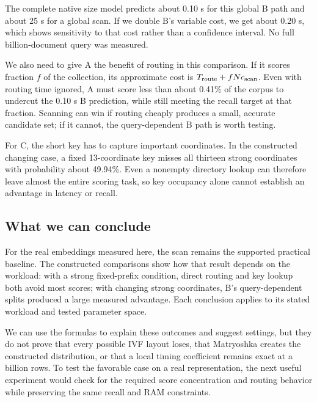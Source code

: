 The complete native size model predicts about 0.10 s for this global B path and about 25 s
for a global scan. If we double B's variable cost, we get about 0.20 s, which shows sensitivity
to that cost rather than a confidence interval. No full billion-document query was measured.

We also need to give A the benefit of routing in this comparison. If it scores fraction $f$
of the collection, its approximate cost is $T_{\rm route}+fNc_{\rm scan}$. Even with routing
time ignored, A must score less than about 0.41\% of the corpus to undercut the 0.10 s B
prediction, while still meeting the recall target at that fraction. Scanning can win if
routing cheaply produces a small, accurate candidate set; if it cannot, the query-dependent
B path is worth testing.


For C, the short key has to capture important coordinates. In the constructed changing case,
a fixed 13-coordinate key misses all thirteen strong coordinates with probability about
49.94\%. Even a nonempty directory lookup can therefore leave almost the entire scoring task,
so key occupancy alone cannot establish an advantage in latency or recall.

\subsection{What we can conclude}
For the real embeddings measured here, the scan remains the supported practical baseline.
The constructed comparisons show how that result depends on the workload: with a strong
fixed-prefix condition, direct routing and key lookup both avoid most scores; with changing
strong coordinates, B's query-dependent splits produced a large measured advantage. Each
conclusion applies to its stated workload and tested parameter space.

We can use the formulas to explain these outcomes and suggest settings, but they do not
prove that every possible IVF layout loses, that Matryoshka creates the constructed
distribution, or that a local timing coefficient remains exact at a billion rows. To test
the favorable case on a real representation, the next useful experiment would check for the
required score concentration and routing behavior while preserving the same recall and
RAM constraints.
